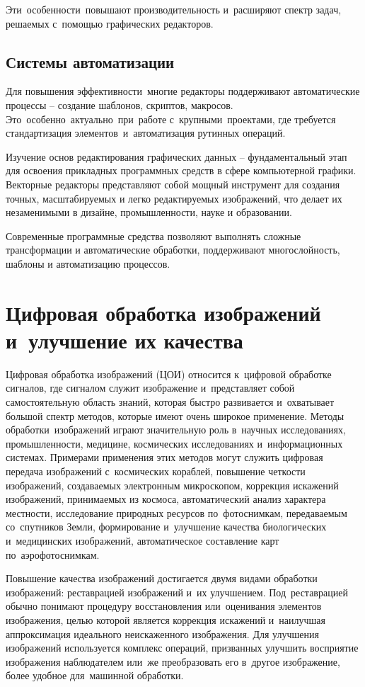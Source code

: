 \documentclass{ou}
\begin{document}
Эти~особенности~повышают производительность и~расширяют спектр задач, решаемых с~помощью графических редакторов.
\subsection{Системы автоматизации}
Для повышения эффективности~многие редакторы поддерживают автоматические процессы -- создание шаблонов, скриптов, макросов. Это~особенно~актуально~при~работе с~крупными~проектами, где требуется стандартизация элементов~и~автоматизация рутинных операций.

Изучение основ редактирования графических данных -- фундаментальный этап для освоения прикладных программных средств в сфере компьютерной графики. Векторные редакторы представляют собой мощный инструмент для создания точных, масштабируемых и легко редактируемых изображений, что делает их незаменимыми в дизайне, промышленности, науке и образовании.

Современные программные средства позволяют выполнять сложные трансформации и автоматические обработки, поддерживают многослойность, шаблоны и автоматизацию процессов.
\newpage
\section{Цифровая обработка изображений и~улучшение их качества}
Цифровая обработка изображений (ЦОИ) относится к~цифровой обработке сигналов, где сигналом служит изображение и~представляет собой самостоятельную область знаний, которая быстро развивается и~охватывает большой спектр методов, которые имеют очень широкое применение. Методы обработки~изображений играют значительную роль в~научных исследованиях, промышленности, медицине, космических исследованиях и~информационных системах. Примерами применения этих методов могут служить цифровая передача изображений с~космических кораблей, повышение четкости изображений, создаваемых электронным микроскопом, коррекция искажений изображений, принимаемых из космоса, автоматический анализ характера местности, исследование природных ресурсов по~фотоснимкам, передаваемым со~спутников Земли, формирование и~улучшение качества биологических и~медицинских изображений, автоматическое составление карт по~аэрофотоснимкам. 

Повышение качества изображений достигается двумя видами обработки изображений: реставрацией изображений и~их улучшением. Под~реставрацией обычно понимают процедуру восстановления или~оценивания элементов изображения, целью которой является коррекция искажений и~наилучшая аппроксимация идеального неискаженного изображения. Для улучшения изображений используется комплекс операций, призванных улучшить восприятие изображения наблюдателем или~же преобразовать его в~другое изображение, более удобное для~машинной обработки. 
\end{document}
